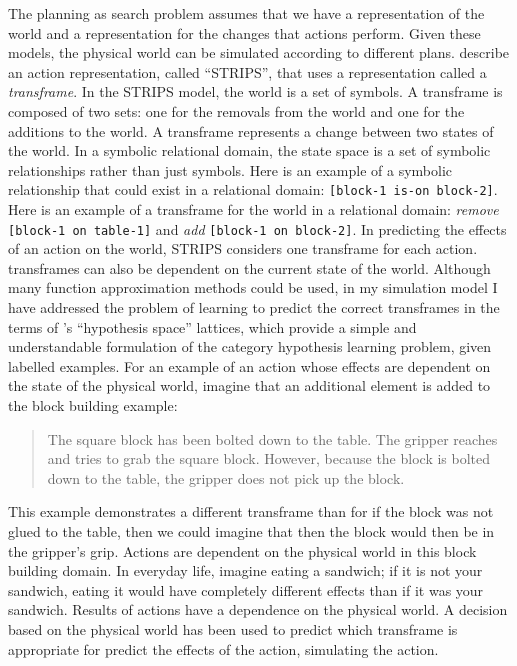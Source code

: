 The planning as search problem assumes that we have a representation
of the world and a representation for the changes that actions
perform.  Given these models, the physical world can be simulated
according to different plans.  \cite{fikes:1972} describe an action
representation, called ``STRIPS'', that uses a representation called a
\emph{transframe}.  In the STRIPS model, the world is a set of
symbols.  A transframe is composed of two sets: one for the removals
from the world and one for the additions to the world.  A transframe
represents a change between two states of the world.  In a symbolic
relational domain, the state space is a set of symbolic relationships
rather than just symbols.  Here is an example of a symbolic
relationship that could exist in a relational domain: {\tt [block-1
    is-on block-2]}.  Here is an example of a transframe for the world
in a relational domain: \emph{remove} {\tt [block-1 on table-1]} and
\emph{add} {\tt [block-1 on block-2]}.  In predicting the effects of
an action on the world, STRIPS considers one transframe for each
action.  transframes can also be dependent on the current state of the
world.  Although many function approximation methods could be used, in
my simulation model I have addressed the problem of learning to
predict the correct transframes in the terms of \cite{mitchell:1982}'s
``hypothesis space'' lattices, which provide a simple and
understandable formulation of the category hypothesis learning
problem, given labelled examples.  For an example of an action whose
effects are dependent on the state of the physical world, imagine that
an additional element is added to the block building example:
\begin{quote}
The square block has been bolted down to the table.  The gripper
reaches and tries to grab the square block.  However, because the
block is bolted down to the table, the gripper does not pick up the
block.
\end{quote}

This example demonstrates a different transframe than for if the block
was not glued to the table, then we could imagine that then the block
would then be in the gripper's grip.  Actions are dependent on the
physical world in this block building domain.  In everyday life,
imagine eating a sandwich; if it is not your sandwich, eating it would
have completely different effects than if it was your sandwich.
Results of actions have a dependence on the physical world.  A
decision based on the physical world has been used to predict which
transframe is appropriate for predict the effects of the action,
simulating the action.

